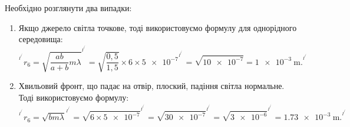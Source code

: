 %
%
^^I^^I
^^I^^I^^I
^^I^^I^^I
^^I
^^I^^IНеобхідно розглянути два випадки:
^^I^^I\begin{enumerate}
^^I^^I^^I\item Якщо джерело світла точкове, тоді використовуємо формулу для однорідного середовища:
^^I^^I^^I\[
^^I^^I^^I^^Ir_6 = \sqrt{\frac{ab}{a+b} m \lambda}
^^I^^I^^I^^I    = \sqrt{\frac{0{,}5}{1{,}5}} \times 6 \times \num{5e-7}
^^I^^I^^I^^I^^I= \sqrt{\num{10e-7}} = \SI{1e-3}{\metre}.
^^I^^I^^I\]
^^I^^I^^I
^^I^^I^^I\item Хвильовий фронт, що падає на отвір, плоский, падіння світла нормальне. Тоді використовуємо формулу:
^^I^^I^^I\[
^^I^^I^^I^^Ir_6 = \sqrt{b m \lambda}
^^I^^I^^I^^I    = \sqrt{6 \times \num{5e-7}}
^^I^^I^^I^^I^^I= \sqrt{\num{30e-7}}
^^I^^I^^I^^I^^I= \sqrt{\num{3e-6}}
^^I^^I^^I^^I^^I= \SI{1.73e-3}{\metre}.
^^I^^I^^I\]
^^I^^I\end{enumerate}
^^I^^I
